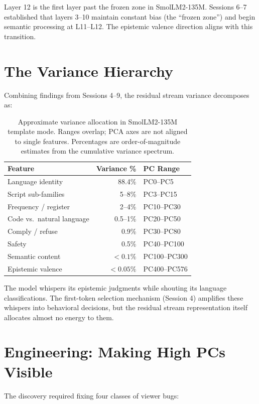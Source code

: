 \documentclass[11pt,a4paper]{article}
\begin{document}
Layer 12 is the first layer past the frozen zone in SmolLM2-135M. Sessions 6--7 established that layers 3--10 maintain constant bias (the ``frozen zone'') and begin semantic processing at L11--L12. The epistemic valence direction aligns with this transition.

\section{The Variance Hierarchy}

Combining findings from Sessions 4--9, the residual stream variance decomposes as:

\begin{table}[h]
\centering
\begin{tabular}{lrl}
\toprule
\textbf{Feature} & \textbf{Variance \%} & \textbf{PC Range} \\
\midrule
Language identity & 88.4\% & PC0--PC5 \\
Script sub-families & 5--8\% & PC3--PC15 \\
Frequency / register & 2--4\% & PC10--PC30 \\
Code vs.\ natural language & 0.5--1\% & PC20--PC50 \\
Comply / refuse & 0.9\% & PC30--PC80 \\
Safety & 0.5\% & PC40--PC100 \\
Semantic content & $<0.1\%$ & PC100--PC300 \\
Epistemic valence & $<0.05\%$ & PC400--PC576 \\
\bottomrule
\end{tabular}
\caption{Approximate variance allocation in SmolLM2-135M template mode. Ranges overlap; PCA axes are not aligned to single features. Percentages are order-of-magnitude estimates from the cumulative variance spectrum.}
\end{table}

The model whispers its epistemic judgments while shouting its language classifications. The first-token selection mechanism (Session 4) amplifies these whispers into behavioral decisions, but the residual stream representation itself allocates almost no energy to them.

\section{Engineering: Making High PCs Visible}

The discovery required fixing four classes of viewer bugs:
\end{document}
